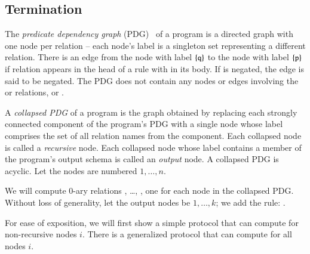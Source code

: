 \subsection{Termination}


The {\em predicate dependency graph} (PDG)~\cite{ullmanbook} of a \lang program is a directed graph with one node per relation -- each node's label is a singleton set representing a different relation.  There is an edge from the node with label $\{\dedalus{q}\}$ to the node with label $\{\dedalus{p}\}$ if relation  appears in the head of a rule with  in its body.  If  is negated, the edge is said to be negated.  The PDG does not contain any nodes or edges involving the  or  relations, or .

A {\em collapsed PDG} of a \lang program is the graph obtained by replacing each strongly connected component of the program's PDG with a single node whose label comprises the set of all relation names from the component.  Each collapsed node is called a {\em recursive} node.  Each collapsed node whose label contains a member of the program's output schema is called an {\em output} node.  A collapsed PDG is acyclic.  Let the nodes are numbered $1,\ldots,n$.

We will compute 0-ary relations , \ldots, , one for each node in the collapsed PDG.  Without loss of generality, let the output nodes be $1,\ldots,k$; we add the rule: .

For ease of exposition, we will first show a simple protocol that can compute  for non-recursive nodes $i$.  There is a generalized protocol that can compute  for all nodes $i$.



